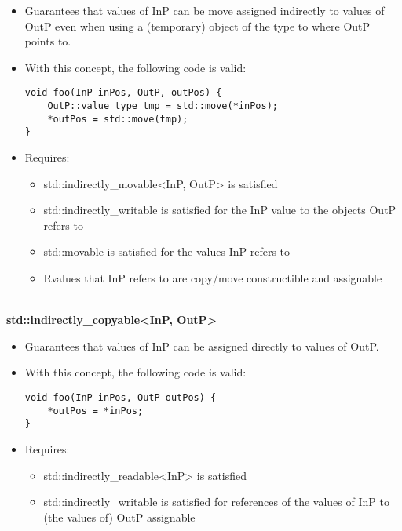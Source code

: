 \begin{itemize}
\item
Guarantees that values of InP can be move assigned indirectly to values of OutP even when using a (temporary) object of the type to where OutP points to.

\item
With this concept, the following code is valid:

\begin{lstlisting}[style=styleCXX]
void foo(InP inPos, OutP, outPos) {
	OutP::value_type tmp = std::move(*inPos);
	*outPos = std::move(tmp);
}
\end{lstlisting}

\item
Requires:
\begin{itemize}
\item
std::indirectly\_movable<InP, OutP> is satisfied

\item
std::indirectly\_writable is satisfied for the InP value to the objects OutP refers to

\item
std::movable is satisfied for the values InP refers to

\item
Rvalues that InP refers to are copy/move constructible and assignable
\end{itemize}
\end{itemize}

\noindent
\hspace*{\fill} \\ %
\textbf{std::indirectly\_copyable<InP, OutP>}

\begin{itemize}
\item
Guarantees that values of InP can be assigned directly to values of OutP.

\item
With this concept, the following code is valid:

\begin{lstlisting}[style=styleCXX]
void foo(InP inPos, OutP outPos) {
	*outPos = *inPos;
}
\end{lstlisting}

\item
Requires:
\begin{itemize}
\item
std::indirectly\_readable<InP> is satisfied

\item
std::indirectly\_writable is satisfied for references of the values of InP to (the values of) OutP assignable
\end{itemize}
\end{itemize}

